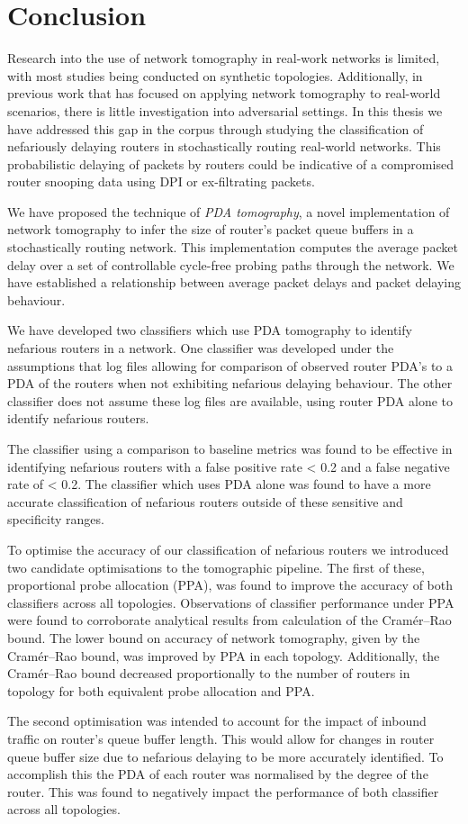 \chapter{Conclusion}
\label{cha:conc}
Research into the use of network tomography in real-work networks is limited, with most studies being conducted on synthetic topologies. Additionally, in previous work that has focused on applying network tomography to real-world scenarios, there is little investigation into adversarial settings. In this thesis we have addressed this gap in the corpus through studying the classification of nefariously delaying routers in stochastically routing real-world networks. This probabilistic delaying of packets by routers could be indicative of a compromised router snooping data using DPI or ex-filtrating packets.\par
We have proposed the technique of \textit{PDA tomography}, a novel implementation of network tomography to infer the size of router's packet queue buffers in a stochastically routing network. This implementation computes the average packet delay over a set of controllable cycle-free probing paths through the network. We have established a relationship between average packet delays and packet delaying behaviour.\par
We have developed two classifiers which use PDA tomography to identify nefarious routers in a network. One classifier was developed under the assumptions that log files allowing for comparison of observed router PDA's to a PDA of the routers when not exhibiting nefarious delaying behaviour. The other classifier does not assume these log files are available, using router PDA alone to identify nefarious routers.\par
The classifier using a comparison to baseline metrics was found to be effective in identifying nefarious routers with a false positive rate < 0.2 and a false negative rate of < 0.2. The classifier which uses PDA alone was found to have a more accurate classification of nefarious routers outside of these sensitive and specificity ranges.\par
To optimise the accuracy of our classification of nefarious routers we introduced two candidate optimisations to the tomographic pipeline. The first of these, proportional probe allocation (PPA), was found to improve the accuracy of both classifiers across all topologies. Observations of classifier performance under PPA were found to corroborate analytical results from calculation of the Cramér–Rao bound. The lower bound on accuracy of network tomography, given by the Cramér–Rao bound, was improved by PPA in each topology. Additionally, the Cramér–Rao bound decreased proportionally to the number of routers in topology for both equivalent probe allocation and PPA.\par
The second optimisation was intended to account for the impact of inbound traffic on router's queue buffer length. This would allow for changes in router queue buffer size due to nefarious delaying to be more accurately identified. To accomplish this the PDA of each router was normalised by the degree of the router. This was found to negatively impact the performance of both classifier across all topologies.\par

